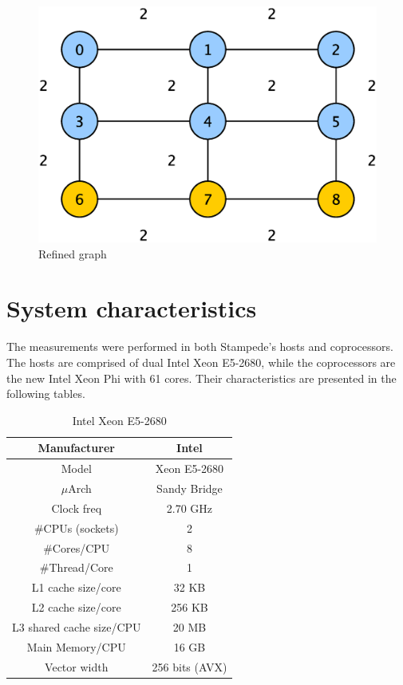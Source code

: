 \documentclass[abstract=on,9pt,twocolumn]{scrartcl}
\begin{document}
\begin{center}
  \begin{figure}[htb]
    \includegraphics[width=\columnwidth]{img/refinement.eps}
    \caption{Refined graph}
    \label{img:refined_graph} 
  \end{figure}
\end{center}



\section{System characteristics}
\label{sec:sys_char}

The measurements were performed in both Stampede's hosts and
coprocessors.
The hosts are comprised of dual Intel Xeon E5-2680, while the
coprocessors are the new Intel Xeon Phi with 61 cores. Their
characteristics are presented in the following tables.

\begin{table}[H]
\centering
\footnotesize
\begin{tabular}{| c | c |}\hline
Manufacturer & Intel\\ \hline
Model & Xeon E5-2680\\ \hline
$\mu$Arch & Sandy Bridge\\ \hline
Clock freq & 2.70 GHz\\ \hline
\#CPUs (sockets) & 2 \\ \hline
\#Cores/CPU & 8\\ \hline
\#Thread/Core & 1\\ \hline
L1 cache size/core & 32 KB\\ \hline
L2 cache size/core & 256 KB\\ \hline
L3 shared cache size/CPU & 20 MB\\ \hline
Main Memory/CPU & 16 GB\\ \hline
Vector width & 256 bits (AVX)\\ \hline
\end{tabular}
\label{tab:host_stampede}
\caption{Intel Xeon E5-2680}
\end{table}
\end{document}

